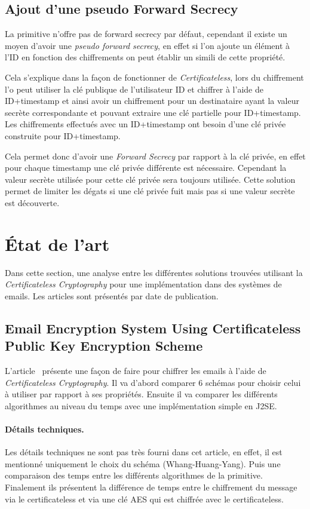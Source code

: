 \subsection{Ajout d'une pseudo Forward Secrecy}
\label{subsec:pseudoSecrecy}
La primitive n'offre pas de forward secrecy par défaut, cependant il existe un moyen d'avoir une \textit{pseudo forward secrecy}, en effet si l'on ajoute un élément à l'ID en fonction des chiffrements on peut établir un simili de cette propriété.

Cela s'explique dans la façon de fonctionner de \textit{Certificateless}, lors du chiffrement l'o peut utiliser la clé publique de l'utilisateur ID et chiffrer à l'aide de ID+timestamp et ainsi avoir un chiffrement pour un destinataire ayant la valeur secrète correspondante et pouvant extraire une clé partielle pour ID+timestamp. Les chiffrements effectués avec un ID+timestamp ont besoin d'une clé privée construite pour ID+timestamp.

Cela permet donc d'avoir une \textit{Forward Secrecy} par rapport à la clé privée, en effet pour chaque timestamp une clé privée différente est nécessaire. Cependant la valeur secrète utilisée pour cette clé privée sera toujours utilisée. Cette solution permet de limiter les dégats si une clé privée fuit mais pas si une valeur secrète est découverte.

\section{État de l'art}
Dans cette section, une analyse entre les différentes solutions trouvées utilisant la \textit{Certificateless Cryptography} pour une implémentation dans des systèmes de emails. Les articles sont présentés par date de publication. 

\subsection{Email Encryption System Using Certificateless Public Key Encryption Scheme}
L'article~\cite{conf/itcs2/ErYTG12} présente une façon de faire pour chiffrer les emails à l'aide de \textit{Certificateless Cryptography}. Il va d'abord comparer 6 schémas pour choisir celui à utiliser par rapport à ses propriétés. Ensuite il va comparer les différents algorithmes au niveau du temps avec une implémentation simple en J2SE. 
\paragraph*{Détails techniques.} Les détails techniques ne sont pas très fourni dans cet article, en effet, il est mentionné uniquement le choix du schéma (Whang-Huang-Yang). Puis une comparaison des temps entre les différents algorithmes de la primitive. Finalement ils présentent la différence de temps entre le chiffrement du message via le certificateless et via une clé AES qui est chiffrée avec le certificateless.
